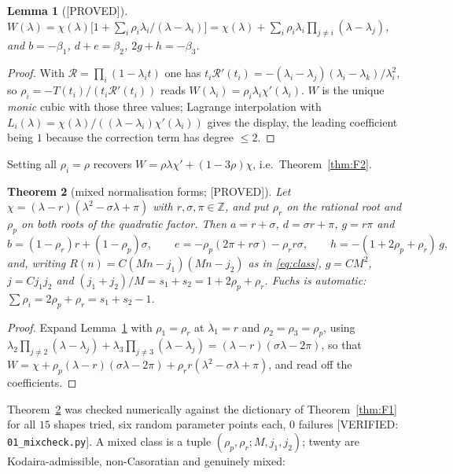 \documentclass[11pt,reqno]{amsart}
\theoremstyle{plain}
\newtheorem{theorem}{Theorem}[section]
\newtheorem{lemma}[theorem]{Lemma}
\theoremstyle{definition}
\theoremstyle{remark}
\theoremstyle{plain}
\newcommand{\Z}{\mathbb{Z}}
\newcommand{\Rc}{\mathcal R}
\newcommand{\Proved}{\textup{\textsf{[PROVED]}}}
\newcommand{\Verified}[1]{\textup{\textsf{[VERIFIED: #1]}}}
\begin{document}
\begin{lemma}[\Proved]\label{lem:D30}
$W(\lambda)=\chi(\lambda)\bigl[1+\sum_i\rho_i\lambda_i/(\lambda-\lambda_i)\bigr]
 =\chi(\lambda)+\sum_i\rho_i\lambda_i\prod_{j\ne i}(\lambda-\lambda_j)$,
and $b=-\beta_1$, $d+e=\beta_2$, $2g+h=-\beta_3$.
\end{lemma}

\begin{proof}
With $\Rc=\prod_i(1-\lambda_it)$ one has
$t_i\Rc'(t_i)=-(\lambda_i-\lambda_j)(\lambda_i-\lambda_k)/\lambda_i^2$, so
$\rho_i=-T(t_i)/(t_i\Rc'(t_i))$ reads $W(\lambda_i)=\rho_i\lambda_i\chi'(\lambda_i)$.
$W$ is the unique \emph{monic} cubic with those three values; Lagrange
interpolation with $L_i(\lambda)=\chi(\lambda)/((\lambda-\lambda_i)\chi'(\lambda_i))$
gives the display, the leading coefficient being $1$ because the correction term
has degree $\le2$.
\end{proof}

Setting all $\rho_i=\rho$ recovers $W=\rho\lambda\chi'+(1-3\rho)\chi$, i.e.\
Theorem~\ref{thm:F2}.

\begin{theorem}[mixed normalisation forms; \Proved]\label{thm:D3}
Let $\chi=(\lambda-r)(\lambda^2-\sigma\lambda+\pi)$ with $r,\sigma,\pi\in\Z$,
and put $\rho_r$ on the rational root and $\rho_p$ on both roots of the quadratic
factor. Then $a=r+\sigma$, $d=\sigma r+\pi$, $g=r\pi$ and
\[
b=(1-\rho_r)r+(1-\rho_p)\sigma,\qquad
e=-\rho_p(2\pi+r\sigma)-\rho_r r\sigma,\qquad
h=-(1+2\rho_p+\rho_r)\,g,
\]
and, writing $R(n)=C(Mn-j_1)(Mn-j_2)$ as in \eqref{eq:class},
$g=CM^2$, $j=Cj_1j_2$ and $(j_1+j_2)/M=s_1+s_2=1+2\rho_p+\rho_r$. Fuchs is
automatic: $\sum\rho_i=2\rho_p+\rho_r=s_1+s_2-1$.
\end{theorem}

\begin{proof}
Expand Lemma~\ref{lem:D30} with $\rho_1=\rho_r$ at $\lambda_1=r$ and
$\rho_2=\rho_3=\rho_p$, using
$\lambda_2\prod_{j\ne2}(\lambda-\lambda_j)+\lambda_3\prod_{j\ne3}(\lambda-\lambda_j)
=(\lambda-r)(\sigma\lambda-2\pi)$, so that
$W=\chi+\rho_p(\lambda-r)(\sigma\lambda-2\pi)+\rho_r r(\lambda^2-\sigma\lambda+\pi)$,
and read off the coefficients.
\end{proof}

Theorem~\ref{thm:D3} was checked numerically against the dictionary of
Theorem~\ref{thm:F1} for all $15$ shapes tried, six random parameter points each,
$0$ failures \Verified{\texttt{01\_mixcheck.py}}. A mixed class is a tuple
$(\rho_p,\rho_r;M,j_1,j_2)$; twenty are Kodaira-admissible, non-Casoratian and
genuinely mixed:
\end{document}
